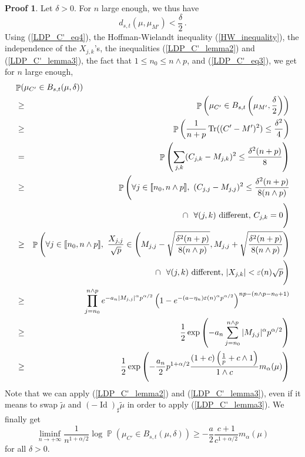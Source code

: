 \documentclass[11pt,a4paper]{article}
\DeclareMathOperator{\PR}{\mathbb{P}}
\DeclareMathOperator{\1}{\mathbf{1}}
\DeclareMathOperator{\Id}{\mathrm{Id}}
\DeclareMathOperator{\Tr}{\mathrm{Tr}}
\theoremstyle{definition}
\newtheorem*{Proof}{Proof}
\begin{document}
\begin{Proof}
Let $\delta>0$. For $n$ large enough, we thus have
\begin{equation} \label{LDP_C'_eq4}
d_{s,t}(\mu,\mu_{M'}) < \frac{\delta}{2} \, .
\end{equation}
Using (\ref{LDP_C'_eq4}), the Hoffman-Wielandt inequality (\ref{HW_inequality}), the independence of the $X_{j,k}$'s, the inequalities (\ref{LDP_C'_lemma2}) and (\ref{LDP_C'_lemma3}), the fact that $1 \le n_0 \le n \wedge p$, and (\ref{LDP_C'_eq3}), we get for $n$ large enough,
\begin{eqnarray*}
\lefteqn{   \PR(\mu_{C'} \in B_{s,t}(\mu,\delta))   } \\
& \ge & \PR \left( \mu_{C'} \in B_{s,t} \left( \mu_{M'},\frac{\delta}{2} \right) \right) \\
& \ge & \PR \left( \frac{1}{n+p} \Tr((C'-M')^2) \le \frac{\delta^2}{4} \right) \\
& = & \PR \left( \sum_{j,k} (C_{j,k}-M_{j,k})^2 \le \frac{\delta^2(n+p)}{8} \right) \\
& \ge & \PR \Bigg( \forall j \in \llbracket n_0,n \wedge p \rrbracket, \ (C_{j,j}-M_{j,j})^2 \le \frac{\delta^2(n+p)}{8(n \wedge p)} \\
& & \quad \quad \ \cap \ \ \forall (j,k) \ \textrm{different,} \ C_{j,k}=0 \Bigg) \\
& \ge & \PR \Bigg( \forall j \in \llbracket n_0,n \wedge p \rrbracket, \ \frac{X_{j,j}}{\sqrt{p}} \in \left( M_{j,j} - \sqrt{\frac{\delta^2(n+p)}{8(n \wedge p)}} , M_{j,j} + \sqrt{\frac{\delta^2(n+p)}{8(n \wedge p)}} \right) \\
& & \quad \quad \ \cap \ \ \forall (j,k) \ \textrm{different,} \ |X_{j,k}| < \varepsilon(n) \sqrt{p} \Bigg) \\
& \ge & \prod_{j=n_0}^{n \wedge p} e^{-a_n |M_{j,j}|^{\alpha} p^{\alpha/2}} \left( 1-e^{-(a-\eta_n) \varepsilon(n)^{\alpha} p^{\alpha/2}} \right)^{np - (n \wedge p - n_0 + 1)} \\
& \ge & \frac12 \exp \left( -a_n \sum_{j=n_0}^{n \wedge p} |M_{j,j}|^{\alpha} p^{\alpha/2} \right) \\
& \ge & \frac12 \exp \left( -\frac{a_n}{2} p^{1+\alpha/2} \frac{(1+c) \left( \frac1p + c \wedge 1 \right)}{1 \wedge c} m_{\alpha}(\mu) \right)
\end{eqnarray*}
Note that we can apply (\ref{LDP_C'_lemma2}) and (\ref{LDP_C'_lemma3}), even if it means to swap $\tilde{\mu}$ and $(-\Id)_{\sharp} \tilde{\mu}$ in order to apply (\ref{LDP_C'_lemma3}).
We finally get
\begin{equation} \label{LDP_C'_eq5}
\liminf_{n \to +\infty} \frac{1}{n^{1+\alpha/2}} \log \PR(\mu_{C'} \in B_{s,t}(\mu,\delta)) \ge -\frac{a}{2} \frac{c+1}{c^{1+\alpha/2}} m_{\alpha}(\mu)
\end{equation}
for all $\delta>0$.


\end{Proof}
\end{document}
